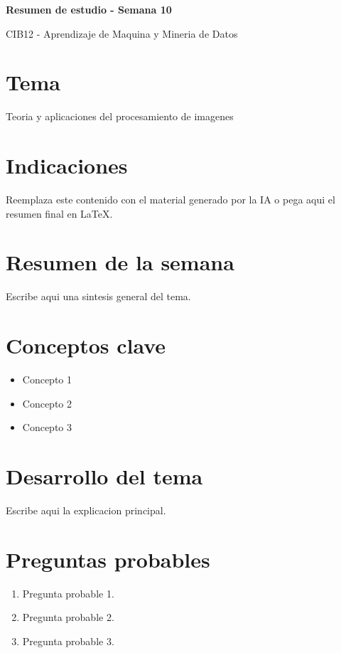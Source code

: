\documentclass[8pt,a4paper,twocolumn]{article}
\newcommand{\resumentitulo}{Resumen de estudio - Semana 10}
\begin{document}
\vspace*{-1.0em}
\begin{tcolorbox}[colback=black!12,colframe=black!35,boxrule=0.3pt,arc=1pt,left=4pt,right=4pt,top=3pt,bottom=3pt]
{\bfseries\normalsize \resumentitulo\par}
{\scriptsize CIB12 - Aprendizaje de Maquina y Mineria de Datos\par}
\end{tcolorbox}
\vspace{0.15em}

\section*{Tema}
Teoria y aplicaciones del procesamiento de imagenes

\section*{Indicaciones}
Reemplaza este contenido con el material generado por la IA o pega aqui el resumen final en LaTeX.

\section*{Resumen de la semana}
Escribe aqui una sintesis general del tema.

\section*{Conceptos clave}
\begin{itemize}
    \item Concepto 1
    \item Concepto 2
    \item Concepto 3
\end{itemize}

\section*{Desarrollo del tema}
Escribe aqui la explicacion principal.

\section*{Preguntas probables}
\begin{enumerate}
    \item Pregunta probable 1.
    \item Pregunta probable 2.
    \item Pregunta probable 3.
\end{enumerate}
\end{document}
